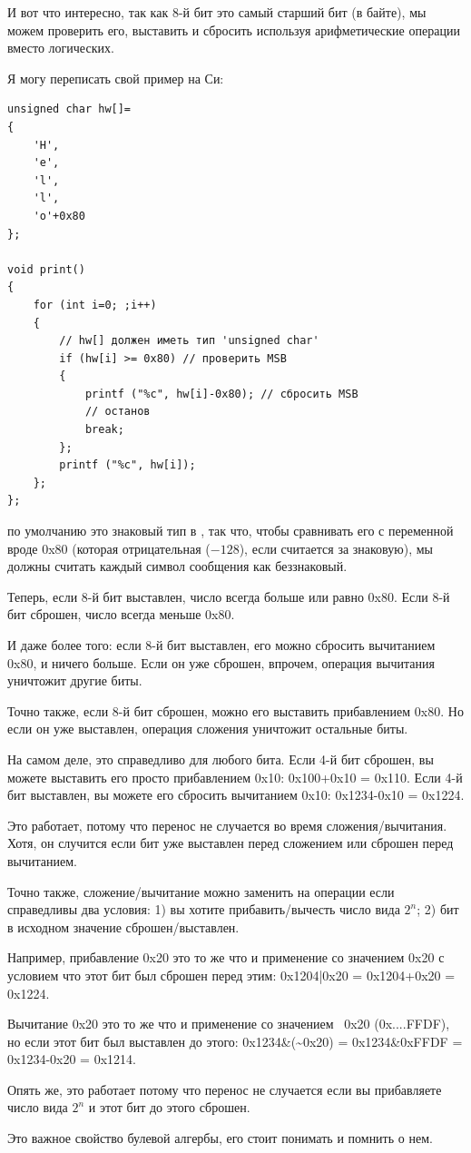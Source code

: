 И вот что интересно, так как 8-й бит это самый старший бит (в байте), мы можем проверить его, выставить и сбросить
используя арифметические операции вместо логических.

Я могу переписать свой пример на Си:

\begin{lstlisting}[style=customc]
unsigned char hw[]=
{
	'H',
	'e',
	'l',
	'l',
	'o'+0x80
};

void print()
{
	for (int i=0; ;i++)
	{
		// hw[] должен иметь тип 'unsigned char'
		if (hw[i] >= 0x80) // проверить MSB
		{
			printf ("%c", hw[i]-0x80); // сбросить MSB
			// останов
			break;
		};
		printf ("%c", hw[i]);
	};
};
\end{lstlisting}

 по умолчанию это знаковый тип в \CCpp, так что, чтобы сравнивать его с переменной вроде 0x80 (которая отрицательная
($-128$),
если считается за знаковую),
мы должны считать каждый символ сообщения как беззнаковый.

Теперь, если 8-й бит выставлен, число всегда больше или равно 0x80.
Если 8-й бит сброшен, число всегда меньше 0x80.

И даже более того: если 8-й бит выставлен, его можно сбросить вычитанием 0x80, и ничего больше.
Если он уже сброшен, впрочем, операция вычитания уничтожит другие биты.

Точно также, если 8-й бит сброшен, можно его выставить прибавлением 0x80.
Но если он уже выставлен, операция сложения уничтожит остальные биты.

На самом деле, это справедливо для любого бита.
Если 4-й бит сброшен, вы можете выставить его просто прибавлением 0x10: 0x100+0x10 = 0x110.
Если 4-й бит выставлен, вы можете его сбросить вычитанием 0x10: 0x1234-0x10 = 0x1224.

Это работает, потому что перенос не случается во время сложения/вычитания.
Хотя, он случится если бит уже выставлен перед сложением или сброшен перед вычитанием.

Точно также, сложение/вычитание можно заменить на операции  если справедливы два условия:
1) вы хотите прибавить/вычесть число вида $2^n$;
2) бит в исходном значение сброшен/выставлен.

Например, прибавление 0x20 это то же что и применение  со значением 0x20 с условием что этот бит был сброшен перед
этим:
0x1204|0x20 = 0x1204+0x20 = 0x1224.

Вычитание 0x20 это то же что и применение  со значением ~0x20 (0x....FFDF), но если этот бит был выставлен до этого:
0x1234\&(\~{}0x20) = 0x1234\&0xFFDF = 0x1234-0x20 = 0x1214.

Опять же, это работает потому что перенос не случается если вы прибавляете число вида $2^n$ и этот бит до этого сброшен.

Это важное свойство булевой алгербы, его стоит понимать и помнить о нем.


